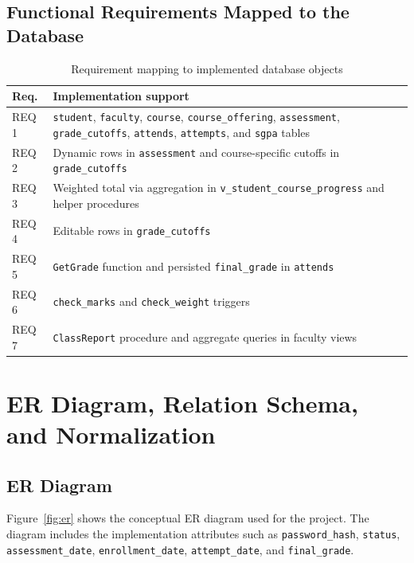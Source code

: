 \documentclass[12pt,a4paper]{report}
\begin{document}
\section{Functional Requirements Mapped to the Database}
\begin{table}[H]
\centering
\caption{Requirement mapping to implemented database objects}
\begin{tabular}{p{} p{}}
\toprule
\textbf{Req.} & \textbf{Implementation support} \\
\midrule
REQ 1 & \texttt{student}, \texttt{faculty}, \texttt{course}, \texttt{course\_offering}, \texttt{assessment}, \texttt{grade\_cutoffs}, \texttt{attends}, \texttt{attempts}, and \texttt{sgpa} tables \\
REQ 2 & Dynamic rows in \texttt{assessment} and course-specific cutoffs in \texttt{grade\_cutoffs} \\
REQ 3 & Weighted total via aggregation in \texttt{v\_student\_course\_progress} and helper procedures \\
REQ 4 & Editable rows in \texttt{grade\_cutoffs} \\
REQ 5 & \texttt{GetGrade} function and persisted \texttt{final\_grade} in \texttt{attends} \\
REQ 6 & \texttt{check\_marks} and \texttt{check\_weight} triggers \\
REQ 7 & \texttt{ClassReport} procedure and aggregate queries in faculty views \\
\bottomrule
\end{tabular}
\end{table}

\chapter{ER Diagram, Relation Schema, and Normalization}

\section{ER Diagram}
Figure~\ref{fig:er} shows the conceptual ER diagram used for the project. The diagram includes the implementation attributes such as \texttt{password\_hash}, \texttt{status}, \texttt{assessment\_date}, \texttt{enrollment\_date}, \texttt{attempt\_date}, and \texttt{final\_grade}.
\end{document}
